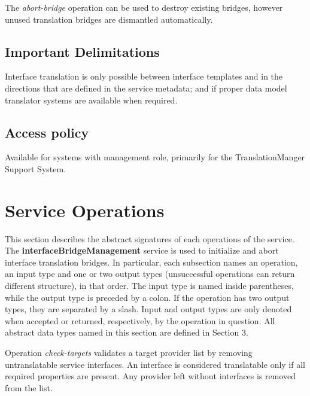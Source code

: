 \documentclass[a4paper]{arrowhead}
\begin{document}
The \textit{abort-bridge} operation can be used to destroy existing bridges, however unused translation bridges are dismantled automatically.

\subsection{Important Delimitations}
\label{sec:delimitations}

Interface translation is only possible between interface templates and in the directions that are defined in the service metadata; and if proper data model translator systems are available when required.  

\subsection{Access policy}
\label{sec:accesspolicy}

Available for systems with management role, primarily for the TranslationManger Support System.

\newpage

\section{Service Operations}
\label{sec:functions}

This section describes the abstract signatures of each operations of the service. The \textbf{interfaceBridgeManagement} service is used to initialize  and abort interface translation bridges.
In particular, each subsection names an operation, an input type and one or two output types (unsuccessful operations can return different structure), in that order.
The input type is named inside parentheses, while the output type is preceded by a colon. If the operation has two output types, they are separated by a slash.
Input and output types are only denoted when accepted or returned, respectively, by the operation in question. All abstract data types named in this section are defined in Section 3.

{}

Operation \textit{check-targets} validates a target provider list by removing untranslatable service interfaces. An interface is considered translatable only if all required properties are present. Any provider left without interfaces is removed from the list.

\end{document}

